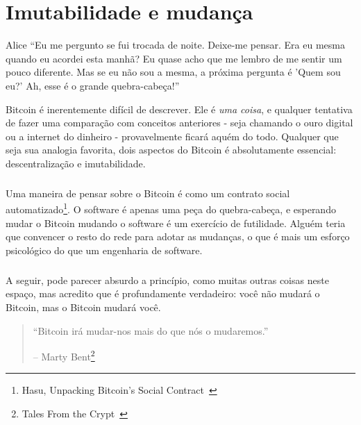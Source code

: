 \chapter{Imutabilidade e mudança}
\label{les:1}

\begin{chapquote}{Alice}
\enquote{Eu me pergunto se fui trocada de noite. Deixe-me pensar. Era eu mesma quando eu
acordei esta manhã? Eu quase acho que me lembro de me sentir um pouco diferente.
Mas se eu não sou a mesma, a próxima pergunta é 'Quem sou eu?' Ah,
esse é o grande quebra-cabeça!}
\end{chapquote}

Bitcoin é inerentemente difícil de descrever. Ele é \textit{uma coisa}, e qualquer
tentativa de fazer uma comparação com conceitos anteriores - seja chamando
o ouro digital ou a internet do dinheiro - provavelmente ficará aquém do todo. Qualquer que seja sua analogia favorita, dois aspectos do
Bitcoin é absolutamente essencial: descentralização e imutabilidade.

\paragraph{}
Uma maneira de pensar sobre o Bitcoin é como um contrato social automatizado\footnote{Hasu,
Unpacking Bitcoin's Social Contract~\cite{social-contract}}. O software é
apenas uma peça do quebra-cabeça, e esperando mudar o Bitcoin mudando o
software é um exercício de futilidade. Alguém teria que convencer o resto do
rede para adotar as mudanças, o que é mais um esforço psicológico do que um
engenharia de software.

\paragraph{}
A seguir, pode parecer absurdo a princípio, como muitas outras coisas neste espaço, mas acredito que é profundamente verdadeiro:
você não mudará o Bitcoin, mas o Bitcoin mudará você.

\begin{quotation}\begin{samepage}
\enquote{Bitcoin irá mudar-nos mais do que nós o mudaremos.}
\begin{flushright} -- Marty Bent\footnote{Tales From the Crypt~\cite{tftc21}}
\end{flushright}\end{samepage}\end{quotation}


